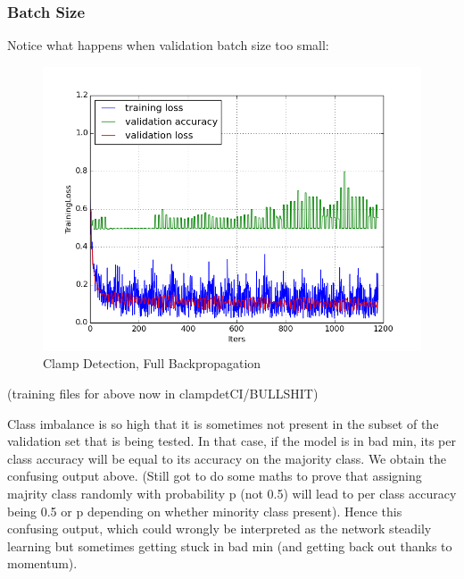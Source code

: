 \documentclass[a4paper,11pt]{article}
\begin{document}
\subsubsection{Batch Size}

Notice what happens when validation batch size too small:

\begin{figure}[h!]
	\centering
	\includegraphics[scale=0.5]{images/plot_clampdetCI_none_testrun.png}
	\caption{Clamp Detection, Full Backpropagation}
\end{figure}

(training files for above now in clampdetCI/BULLSHIT)

Class imbalance is so high that it is sometimes not present in the subset of the validation set that is being tested. In that case, if the model is in bad min, its per class accuracy will be equal to its accuracy on the majority class. We obtain the confusing output above. (Still got to do some maths to prove that assigning majrity class randomly with probability p (not 0.5) will lead to per class accuracy being 0.5 or p depending on whether minority class present). Hence this confusing output, which could wrongly be interpreted as the network steadily learning but sometimes getting stuck in bad min (and getting back out thanks to momentum). \\


\end{document}
